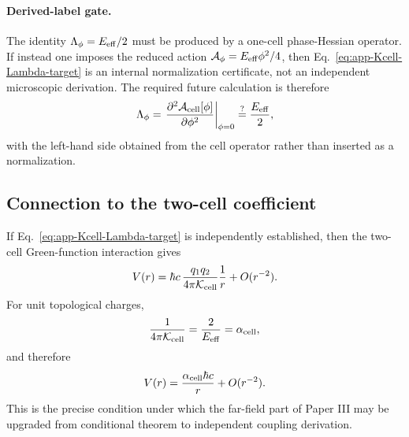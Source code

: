 \documentclass[11pt]{article}
\begin{document}
\paragraph{Derived-label gate.}
The identity \(\Lambda_\phi=E_{\rm eff}/2\) must be produced by a one-cell
phase-Hessian operator.  If instead one imposes the reduced action
\(\mathcal A_\phi=E_{\rm eff}\phi^2/4\), then
Eq.~\eqref{eq:app-Kcell-Lambda-target} is an internal normalization certificate,
not an independent microscopic derivation.  The required future calculation is
therefore
\[
  \Lambda_\phi
  =
  \left.
  \frac{\partial^2\mathcal A_{\rm cell}[\phi]}
       {\partial\phi^2}
  \right|_{\phi=0}
  \stackrel{?}{=}
  \frac{E_{\rm eff}}{2},
\]
with the left-hand side obtained from the cell operator rather than inserted as
a normalization.

\subsection{Connection to the two-cell coefficient}

If Eq.~\eqref{eq:app-Kcell-Lambda-target} is independently established, then
the two-cell Green-function interaction gives
\begin{equation}
  V(r)
  =
  \hbar c\,
  \frac{q_1q_2}{4\pi\mathcal K_{\rm cell}}
  \frac{1}{r}
  +
  O(r^{-2}).
\end{equation}
For unit topological charges,
\begin{equation}
  \frac{1}{4\pi\mathcal K_{\rm cell}}
  =
  \frac{2}{E_{\rm eff}}
  =
  \alpha_{\rm cell},
\end{equation}
and therefore
\begin{equation}
  V(r)
  =
  \frac{\alpha_{\rm cell}\hbar c}{r}
  +
  O(r^{-2}).
\end{equation}
This is the precise condition under which the far-field part of Paper III may
be upgraded from conditional theorem to independent coupling derivation.
\end{document}
